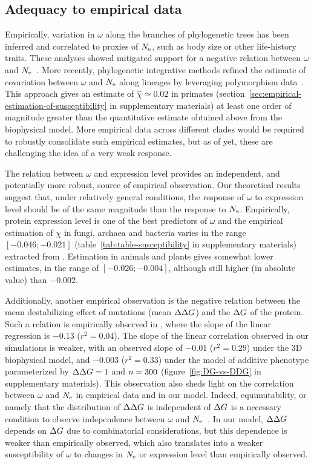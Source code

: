\subsection{Adequacy to empirical data}
Empirically, variation in $\omega$ along the branches of phylogenetic trees has been inferred and correlated to proxies of $N_{\text{e}}$, such as body size or other life-history traits.
These analyses showed mitigated support for a negative relation between $\omega$ and $N_{\text{e}}$~\citep{Lanfear2014}.
More recently, phylogenetic integrative methods refined the estimate of covariation between $\omega$ and $N_{\text{e}}$ along lineages by leveraging polymorphism data~\citep{Brevet2019}.
This approach gives an estimate of $\hat{\chi} \simeq 0.02$ in primates (section~\ref{sec:empirical-estimation-of-susceptibility} in supplementary materials) at least one order of magnitude greater than the quantitative estimate obtained above from the biophysical model.
More empirical data across different clades would be required to robustly consolidate such empirical estimates, but as of yet, these are challenging the idea of a very weak response.

The relation between $\omega$ and expression level provides an independent, and potentially more robust, source of empirical observation.
Our theoretical results suggest that, under relatively general conditions, the response of $\omega$ to expression level should be of the same magnitude than the response to $N_{\text{e}}$.
Empirically, protein expression level is one of the best predictors of $\omega$ and the empirical estimation of $\chi$ in fungi, archaea and bacteria varies in the range $[-0.046;-0.021]$ (table~\ref{tab:table-susceptibility} in supplementary materials) extracted from \citet{Zhang2015}.
Estimation in animals and plants gives somewhat lower estimates, in the range of $[-0.026;-0.004]$, although still higher (in absolute value) than $-0.002$.

Additionally, another empirical observation is the negative relation between the mean destabilizing effect of mutations (mean $\Delta \Delta G$) and the $\Delta G$ of the protein.
Such a relation is empirically observed in \citet{Serohijos2012}, where the slope of the linear regression is $-0.13$ ($r^2=0.04$).
The slope of the linear correlation observed in our simulations is weaker, with an observed slope of $-0.01$ ($r^2=0.29$) under the 3D biophysical model, and $-0.003$ ($r^2=0.33$) under the model of additive \gls{phenotype} parameterized by $\Delta \Delta G = 1$ and $n=300$ (figure~\ref{fig:DG-vs-DDG} in supplementary materials).
This observation also sheds light on the correlation between $\omega$ and $N_{\text{e}}$ in empirical data and in our model.
Indeed, equimutability, or namely that the distribution of $\Delta \Delta G$ is independent of $\Delta G$ is a necessary condition to observe independence between $\omega$ and $N_{\text{e}}$~\citep{Cherry1998}.
In our model, $\Delta \Delta G$ depends on $\Delta G$ due to combinatorial considerations, but this dependence is weaker than empirically observed, which also translates into a weaker susceptibility of $\omega$ to changes in $N_{\text{e}}$ or expression level than empirically observed.

